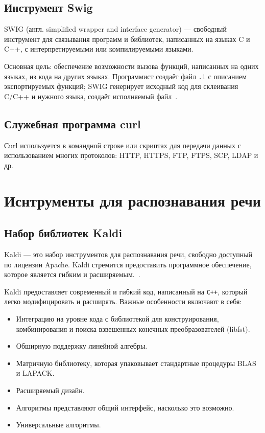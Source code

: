 \subsection{Инструмент Swig}
SWIG (англ. simplified wrapper and interface generator) — свободный инструмент
для связывания программ и библиотек, написанных на языках C и C++, с
интерпретируемыми или компилируемыми языками.

Основная цель: обеспечение возможности вызова
функций, написанных на одних языках, из кода на других языках. Программист
создаёт файл \texttt{.i} с описанием экспортируемых функций; SWIG генерирует исходный код
для склеивания C/C++ и нужного языка, создаёт исполняемый файл~\cite{swig}.

\subsection{Служебная программа curl}
Сurl используется в командной строке или скриптах для передачи данных с использованием
многих протоколов: HTTP, HTTPS, FTP, FTPS, SCP, LDAP и др.

\section{Иснтрументы для распознавания речи}

\subsection{Набор библиотек Kaldi}
Kaldi --- это набор инструментов для распознавания речи, свободно доступный по
лицензии Apache. Kaldi стремится предоставить программное обеспечение, которое
является гибким и расширяемым.~\cite{kaldi}.

Kaldi предоставляет современный и гибкий код, написанный на \texttt{C++}, который
легко модифицировать и расширять. Важные особенности включают в себя:

\begin{itemize}
    \item Интеграцию на уровне кода с библиотекой для конструирования, комбинирования
        и поиска взвешенных конечных преобразователей (libfst).
    \item Обширную поддержку линейной алгебры.
    \item Матричную библиотеку, которая упаковывает стандартные процедуры BLAS и LAPACK.
    \item Расширяемый дизайн.
    \item Алгоритмы представляют общий интерфейс, насколько это возможно.
    \item Универсальные алгоритмы.
\end{itemize}

